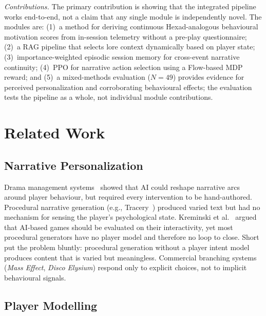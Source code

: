 \documentclass[conference]{IEEEtran}
\begin{document}
\textit{Contributions.} The primary contribution is showing that the integrated pipeline works end-to-end, not a claim that any single module is independently novel. The modules are: (1)~a method for deriving continuous Hexad-analogous behavioural motivation scores from in-session telemetry without a pre-play questionnaire; (2)~a RAG pipeline that selects lore context dynamically based on player state; (3)~importance-weighted episodic session memory for cross-event narrative continuity; (4)~PPO for narrative action selection using a Flow-based MDP reward; and (5)~a mixed-methods evaluation ($N = 49$) provides evidence for perceived personalization and corroborating behavioural effects; the evaluation tests the pipeline as a whole, not individual module contributions.

\section{Related Work}

\subsection{Narrative Personalization}

Drama management systems~\cite{mateas2003facade} showed that AI could reshape narrative arcs around player behaviour, but required every intervention to be hand-authored. Procedural narrative generation (e.g., Tracery~\cite{compton2015tracery}) produced varied text but had no mechanism for sensing the player's psychological state. Kreminski et al.~\cite{kreminski2019evaluating} argued that AI-based games should be evaluated on their interactivity, yet most procedural generators have no player model and therefore no loop to close. Short~\cite{short2019procedural} put the problem bluntly: procedural generation without a player intent model produces content that is varied but meaningless. Commercial branching systems (\textit{Mass Effect}, \textit{Disco Elysium}) respond only to explicit choices, not to implicit behavioural signals.

\subsection{Player Modelling}
\end{document}

